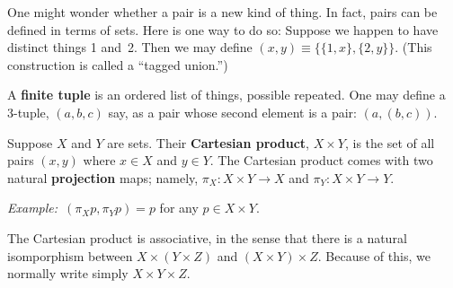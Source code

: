 \documentclass[10pt, a4paper, twocolumn]{article}
\newcommand{\defn}[1]{\textbf{#1}}
\newcommand{\eg}{\emph{Example:}\relax}
\begin{document}
One might wonder whether a pair is a new kind of thing. In fact, pairs can be
defined in terms of sets. Here is one way to do so: Suppose we happen to have
distinct things 1 and~2. Then we may define $(x, y) \equiv \{\{1, x\}, \{2,
y\}\}$. (This construction is called a “tagged union.”)

A \defn{finite tuple} is an ordered list of things, possible repeated. One may
define a 3-tuple, $(a, b, c)$ say, as a pair whose second element is a pair:
$(a, (b, c))$. 

Suppose $X$ and $Y$ are sets. Their \defn{Cartesian product}, $X \times Y$, is the
set of all pairs $(x, y)$ where $x \in X$ and $y \in Y$. The Cartesian product comes
with two natural \defn{projection} maps; namely, $\pi_X : X \times Y \to X$ and $\pi_Y : X
\times Y \to Y$.

\eg\ $(\pi_X p, \pi_Y p) = p$ for any $p \in X \times Y$.

The Cartesian product is associative, in the sense that there is a natural
isomporphism between $X \times (Y \times Z)$ and $(X \times Y) \times Z$. Because of this, we
normally write simply $X \times Y \times Z$.
\end{document}
